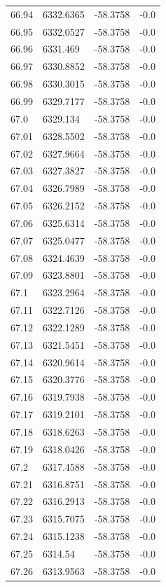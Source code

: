 \begin{table}[H]
\begin{tabular}{llll}
66.94 & 6332.6365 & -58.3758 & -0.0 \\
66.95 & 6332.0527 & -58.3758 & -0.0 \\
66.96 & 6331.469 & -58.3758 & -0.0 \\
66.97 & 6330.8852 & -58.3758 & -0.0 \\
66.98 & 6330.3015 & -58.3758 & -0.0 \\
66.99 & 6329.7177 & -58.3758 & -0.0 \\
67.0 & 6329.134 & -58.3758 & -0.0 \\
67.01 & 6328.5502 & -58.3758 & -0.0 \\
67.02 & 6327.9664 & -58.3758 & -0.0 \\
67.03 & 6327.3827 & -58.3758 & -0.0 \\
67.04 & 6326.7989 & -58.3758 & -0.0 \\
67.05 & 6326.2152 & -58.3758 & -0.0 \\
67.06 & 6325.6314 & -58.3758 & -0.0 \\
67.07 & 6325.0477 & -58.3758 & -0.0 \\
67.08 & 6324.4639 & -58.3758 & -0.0 \\
67.09 & 6323.8801 & -58.3758 & -0.0 \\
67.1 & 6323.2964 & -58.3758 & -0.0 \\
67.11 & 6322.7126 & -58.3758 & -0.0 \\
67.12 & 6322.1289 & -58.3758 & -0.0 \\
67.13 & 6321.5451 & -58.3758 & -0.0 \\
67.14 & 6320.9614 & -58.3758 & -0.0 \\
67.15 & 6320.3776 & -58.3758 & -0.0 \\
67.16 & 6319.7938 & -58.3758 & -0.0 \\
67.17 & 6319.2101 & -58.3758 & -0.0 \\
67.18 & 6318.6263 & -58.3758 & -0.0 \\
67.19 & 6318.0426 & -58.3758 & -0.0 \\
67.2 & 6317.4588 & -58.3758 & -0.0 \\
67.21 & 6316.8751 & -58.3758 & -0.0 \\
67.22 & 6316.2913 & -58.3758 & -0.0 \\
67.23 & 6315.7075 & -58.3758 & -0.0 \\
67.24 & 6315.1238 & -58.3758 & -0.0 \\
67.25 & 6314.54 & -58.3758 & -0.0 \\
67.26 & 6313.9563 & -58.3758 & -0.0 \\

\end{tabular}
\end{table}
